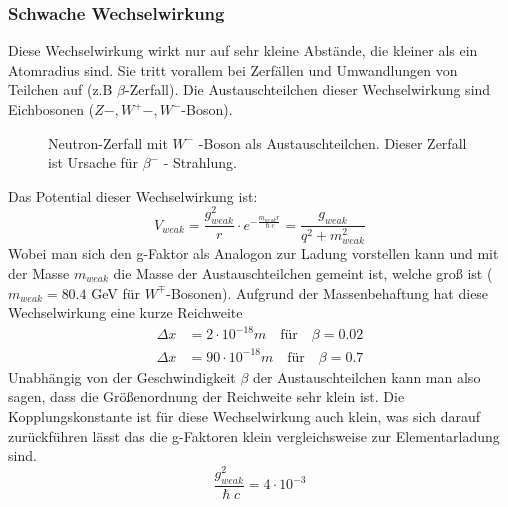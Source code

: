 \documentclass[Ex4_Zusammenfassung.tex]{subfiles}
\begin{document}
\subsubsection*{Schwache Wechselwirkung}
Diese Wechselwirkung wirkt nur auf sehr kleine Abstände, die kleiner als ein Atomradius sind. Sie tritt vorallem bei Zerfällen und Umwandlungen von Teilchen auf (z.B  $\beta$-Zerfall). Die Austauschteilchen dieser Wechselwirkung sind Eichbosonen ($Z-,W^+-,W^-$-Boson).
\begin{figure}[H]
\centering
{}
					\caption{Neutron-Zerfall mit $W^-$ -Boson als Austauschteilchen. Dieser Zerfall ist Ursache für $ \beta^- $ - Strahlung.}
\end{figure}
Das Potential dieser Wechselwirkung ist:
\begin{equation}
V_{weak} = \frac{g_{weak}^2}{r} \cdot e^{-\frac{m_{weak} r}{\hslash c}} = \frac{g_{weak}}{q^2 + m_{weak}^2}
\end{equation}
Wobei man sich den g-Faktor als Analogon zur Ladung vorstellen kann und mit der Masse $ m_{weak} $ die Masse der Austauschteilchen gemeint ist, welche groß ist ( $m_{weak} = 80.4 $ GeV für $ W^{\mp} $-Bosonen).\newline
Aufgrund der Massenbehaftung hat diese Wechselwirkung eine kurze Reichweite 
\begin{align}
\Delta x &= 2 \cdot 10^{-18} m \quad \text{für}  \quad \beta = 0.02 \\
\Delta x &= 90 \cdot 10^{-18} m \quad \text{für} \quad \beta = 0.7
\end{align} 
Unabhängig von der Geschwindigkeit $\beta$ der Austauschteilchen kann man also sagen, dass die Größenordnung der Reichweite sehr klein ist. Die Kopplungskonstante ist für diese Wechselwirkung auch klein, was sich darauf zurückführen lässt das die g-Faktoren klein vergleichsweise zur Elementarladung sind. 
\begin{equation}
\frac{g_{weak}^2}{\hslash c} = 4 \cdot 10^{-3}
\end{equation} \newpage
\end{document}
